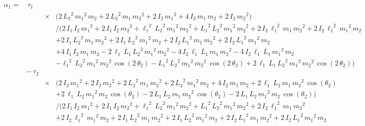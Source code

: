 \documentclass[a4paper,11pt]{jsarticle}
\begin{document}
\clearpage
\tiny
\begin{align*}
  \alpha_1 =
  &\,\tau _{1} & &
  \\
    & &\times &
    \Bigg(2\,{L_2}^2\,{m_{1}}^2\,m_{2}+2\,{L_2}^2\,m_{1}\,{m_{2}}^2+2\,I_{2}\,{m_{1}}^2+4\,I_{2}\,m_{1}\,m_{2}+2\,I_{2}\,{m_{2}}^2\Bigg)
    \\
    & & &\Bigg/ 
    \Bigg(
      2\,I_{1}\,I_{2}\,{m_{1}}^2+
      2\,I_{1}\,I_{2}\,{m_{2}}^2+
      {\ell_{1}}^2\,{L_2}^2\,{m_{1}}^2\,{m_{2}}^2+
      {L_1}^2\,{L_2}^2\,{m_{1}}^2\,{m_{2}}^2+
      2\,I_{2}\,{\ell_{1}}^2\,m_{1}\,{m_{2}}^2+
      2\,I_{2}\,{\ell_{1}}^2\,{m_{1}}^2\,m_{2}
      \\ & & &+
      2\,I_{1}\,{L_2}^2\,m_{1}\,{m_{2}}^2+
      2\,I_{1}\,{L_2}^2\,{m_{1}}^2\,m_{2}+
      2\,I_{2}\,{L_1}^2\,m_{1}\,{m_{2}}^2+
      2\,I_{2}\,{L_1}^2\,{m_{1}}^2\,m_{2}
      \\ & & &+
      4\,I_{1}\,I_{2}\,m_{1}\,m_{2}-
      2\,\ell_{1}\,L_1\,{L_2}^2\,{m_{1}}^2\,{m_{2}}^2-
      4\,I_{2}\,\ell_{1}\,L_1\,m_{1}\,{m_{2}}^2-
      4\,I_{2}\,\ell_{1}\,L_1\,{m_{1}}^2\,m_{2}
      \\ & & &-
      {\ell_{1}}^2\,{L_2}^2\,{m_{1}}^2\,{m_{2}}^2\,\cos\left(2\,\theta_2\right)-
      {L_1}^2\,{L_2}^2\,{m_{1}}^2\,{m_{2}}^2\,\cos\left(2\,\theta_2\right)+
      2\,\ell_{1}\,L_1\,{L_2}^2\,{m_{1}}^2\,{m_{2}}^2\,\cos\left(2\,\theta_2\right)
    \Bigg)
  \\
  &-\,\tau _{2} & &
  \\
    & & \times &
    \Bigg(
      2\,I_{2}\,{m_{1}}^2+
      2\,I_{2}\,{m_{2}}^2+
      2\,{L_2}^2\,m_{1}\,{m_{2}}^2+
      2\,{L_2}^2\,{m_{1}}^2\,m_{2}+
      4\,I_{2}\,m_{1}\,m_{2}+
      2\,\ell_{1}\,L_2\,m_{1}\,{m_{2}}^2\,\cos\left(\theta_2\right)
      \\ & & &+
      2\,\ell_{1}\,L_2\,{m_{1}}^2\,m_{2}\,\cos\left(\theta_2\right)-
      2\,L_1\,L_2\,m_{1}\,{m_{2}}^2\,\cos\left(\theta_2\right)-
      2\,L_1\,L_2\,{m_{1}}^2\,m_{2}\,\cos\left(\theta_2\right)
    \Bigg)
    \\
    & & &\Bigg/
    \Bigg(
      2\,I_{1}\,I_{2}\,{m_{1}}^2+
      2\,I_{1}\,I_{2}\,{m_{2}}^2+
      {\ell_{1}}^2\,{L_2}^2\,{m_{1}}^2\,{m_{2}}^2+
      {L_1}^2\,{L_2}^2\,{m_{1}}^2\,{m_{2}}^2+
      2\,I_{2}\,{\ell_{1}}^2\,m_{1}\,{m_{2}}^2
      \\ & & &+
      2\,I_{2}\,{\ell_{1}}^2\,{m_{1}}^2\,m_{2}+
      2\,I_{1}\,{L_2}^2\,m_{1}\,{m_{2}}^2+
      2\,I_{1}\,{L_2}^2\,{m_{1}}^2\,m_{2}+
      2\,I_{2}\,{L_1}^2\,m_{1}\,{m_{2}}^2+
      2\,I_{2}\,{L_1}^2\,{m_{1}}^2\,m_{2}

\end{align*}
\end{document}
